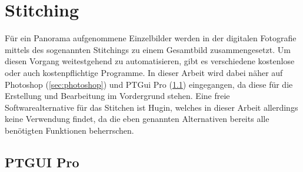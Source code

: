 \documentclass[liststotoc,bibtotoc,fontsize=14pt,]{scrreprt}
\begin{document}
			
	\chapter{Stitching}
	\label{ch:stitiching}
	Für ein Panorama aufgenommene Einzelbilder werden in der digitalen Fotografie mittels des sogenannten Stitchings zu einem Gesamtbild zusammengesetzt. Um diesen Vorgang weitestgehend zu automatisieren, gibt es verschiedene kostenlose oder auch kostenpflichtige Programme. In dieser Arbeit wird dabei näher auf Photoshop (\ref{sec:photoshop}) und PTGui Pro (\ref{sec:ptgui}) eingegangen, da diese für die Erstellung und Bearbeitung im Vordergrund stehen. Eine freie Softwarealternative für das Stitchen ist Hugin, welches in dieser Arbeit allerdings keine Verwendung findet, da die eben genannten Alternativen bereits alle benötigten Funktionen beherrschen.
	
	\section{PTGUI Pro}
	\label{sec:ptgui}
	
\end{document}
